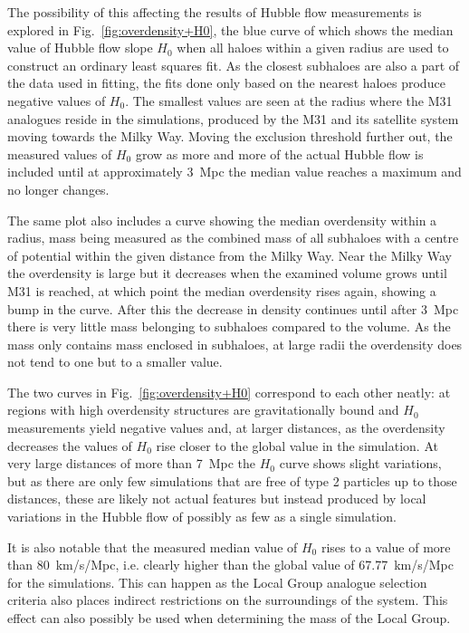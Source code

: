 \documentclass[english, oneside]{HYgradu}
\begin{document}
The possibility of this affecting the results of Hubble flow measurements is explored in Fig.~\ref{fig:overdensity+H0}, the blue curve of which shows the median value of Hubble flow slope $H_0$ when all haloes within a given radius are used to construct an ordinary least squares fit. As the closest subhaloes are also a part of the data used in fitting, the fits done only based on the nearest haloes produce negative values of $H_0$. The smallest values are seen at the radius where the M31 analogues reside in the simulations, produced by the M31 and its satellite system moving towards the Milky Way. Moving the exclusion threshold further out, the measured values of $H_0$ grow as more and more of the actual Hubble flow is included until at approximately 3~Mpc the median value reaches a maximum and no longer changes.

The same plot also includes a curve showing the median overdensity within a radius, mass being measured as the combined mass of all subhaloes with a centre of potential within the given distance from the Milky Way. Near the Milky Way the overdensity is large but it decreases when the examined volume grows until M31 is reached, at which point the median overdensity rises again, showing a bump in the curve. After this the decrease in density continues until after 3~Mpc there is very little mass belonging to subhaloes compared to the  volume. As the mass only contains mass enclosed in subhaloes, at large radii the overdensity does not tend to one but to a smaller value.

The two curves in Fig.~\ref{fig:overdensity+H0} correspond to each other neatly: at regions with high overdensity structures are gravitationally bound and $H_0$ measurements yield negative values and, at larger distances, as the overdensity decreases the values of $H_0$ rise closer to the global value in the simulation. At very large distances of more than 7~Mpc the $H_0$ curve shows slight variations, but as there are only few simulations that are free of type 2 particles up to those distances, these are likely not actual features but instead produced by local variations in the Hubble flow of possibly as few as a single simulation.

It is also notable that the measured median value of $H_0$ rises to a value of more than 80~km/s/Mpc, i.e. clearly higher than the global value of 67.77~km/s/Mpc for the simulations. This can happen as the Local Group analogue selection criteria also places indirect restrictions on the surroundings of the system. This effect can also possibly be used when determining the mass of the Local Group.
\end{document}
